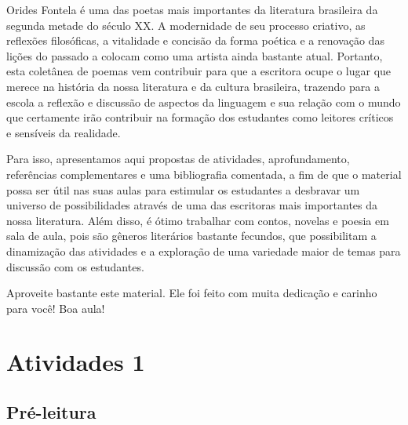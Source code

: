 \documentclass[12pt]{extarticle}
\begin{document}
Orides Fontela é uma das poetas mais importantes da literatura
brasileira da segunda metade do século XX. A modernidade de seu processo
criativo, as reflexões filosóficas, a vitalidade e concisão da forma
poética e a renovação das lições do passado a colocam como uma artista
ainda bastante atual. Portanto, esta coletânea de poemas vem contribuir
para que a escritora ocupe o lugar que merece na história da nossa
literatura e da cultura brasileira, trazendo para a escola a reflexão e
discussão de aspectos da linguagem e sua relação com o mundo que
certamente irão contribuir na formação dos estudantes como leitores
críticos e sensíveis da realidade.

Para isso, apresentamos aqui propostas de atividades, aprofundamento,
referências complementares e uma bibliografia comentada, a fim de que o
material possa ser útil nas suas aulas para estimular os estudantes a
desbravar um universo de possibilidades através de uma das escritoras
mais importantes da nossa literatura. Além disso, é ótimo trabalhar com
contos, novelas e poesia em sala de aula, pois são gêneros literários
bastante fecundos, que possibilitam a dinamização das atividades e a
exploração de uma variedade maior de temas para discussão com os
estudantes.

Aproveite bastante este material. Ele foi feito com muita dedicação e
carinho para você! Boa aula!

\reversemarginpar
\marginparwidth=5cm


\section{Atividades 1}


\subsection{Pré-leitura}
\end{document}
